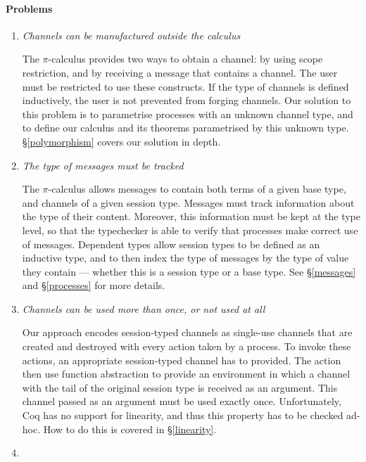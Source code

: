 \documentclass{mproj}
\newcommand{\picalc}{$\pi$-calculus}
\begin{document}
\paragraph{Problems}
\begin{enumerate}
    \item \emph{Channels can be manufactured outside the calculus}

    The \picalc{} provides two ways to obtain a channel: by using scope restriction, and by receiving a message that contains a channel. The user must be restricted to use these constructs. If the type of channels is defined inductively, the user is not prevented from forging channels. Our solution to this problem is to parametrise processes with an unknown channel type, and to define our calculus and its theorems parametrised by this unknown type. \S \ref{polymorphism} covers our solution in depth.

    \item \emph{The type of messages must be tracked}

    The \picalc{} allows messages to contain both terms of a given base type, and channels of a given session type. Messages must track information about the type of their content. Moreover, this information must be kept at the type level, so that the typechecker is able to verify that processes make correct use of messages. Dependent types allow session types to be defined as an inductive type, and to then index the type of messages by the type of value they contain --- whether this is a session type or a base type. See \S \ref{messages} and \S \ref{processes} for more details.

    \item \emph{Channels can be used more than once, or not used at all}

    Our approach encodes session-typed channels as single-use channels that are created and destroyed with every action taken by a process. To invoke these actions, an appropriate session-typed channel has to provided. The action then use function abstraction to provide an environment in which a channel with the tail of the original session type is received as an argument. This channel passed as an argument must be used exactly once. Unfortunately, Coq has no support for linearity, and thus this property has to be checked ad-hoc. How to do this is covered in \S \ref{linearity}.

    \item {}
\end{enumerate}
\end{document}
